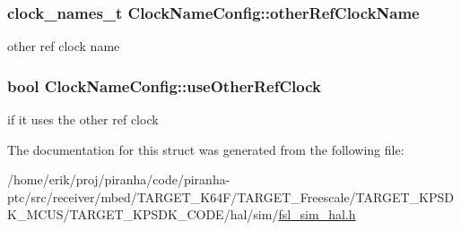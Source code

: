 \subsubsection[{\texorpdfstring{other\+Ref\+Clock\+Name}{otherRefClockName}}]{\setlength{\rightskip}{0pt plus 5cm}clock\+\_\+names\+\_\+t Clock\+Name\+Config\+::other\+Ref\+Clock\+Name}\hypertarget{structClockNameConfig_a12d858bf0eb237aff5836b3c45157237}{}\label{structClockNameConfig_a12d858bf0eb237aff5836b3c45157237}
other ref clock name 
\subsubsection[{\texorpdfstring{use\+Other\+Ref\+Clock}{useOtherRefClock}}]{\setlength{\rightskip}{0pt plus 5cm}bool Clock\+Name\+Config\+::use\+Other\+Ref\+Clock}\hypertarget{structClockNameConfig_a5bee173b4b267afb9c0f752417728cdc}{}\label{structClockNameConfig_a5bee173b4b267afb9c0f752417728cdc}
if it uses the other ref clock 

The documentation for this struct was generated from the following file\+:\begin{DoxyCompactItemize}
\item 
/home/erik/proj/piranha/code/piranha-\/ptc/src/receiver/mbed/\+T\+A\+R\+G\+E\+T\+\_\+\+K64\+F/\+T\+A\+R\+G\+E\+T\+\_\+\+Freescale/\+T\+A\+R\+G\+E\+T\+\_\+\+K\+P\+S\+D\+K\+\_\+\+M\+C\+U\+S/\+T\+A\+R\+G\+E\+T\+\_\+\+K\+P\+S\+D\+K\+\_\+\+C\+O\+D\+E/hal/sim/\hyperlink{fsl__sim__hal_8h}{fsl\+\_\+sim\+\_\+hal.\+h}\end{DoxyCompactItemize}
